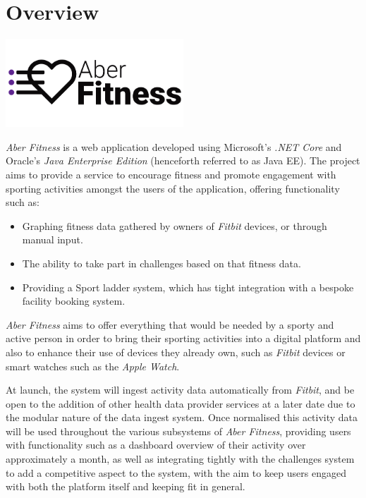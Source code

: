\chapter{Overview}

\begin{center}
	\includegraphics[width=0.5\textwidth]{Images/aberfitness.png}
\end{center}

\par
\textit{Aber Fitness} is a web application developed using Microsoft's \textit{.NET Core} and Oracle's \textit{Java Enterprise Edition} (henceforth referred to as Java EE). The project aims to provide a service to encourage fitness and promote engagement with sporting activities amongst the users of the application, offering functionality such as:

\begin{itemize}
\item Graphing fitness data gathered by owners of \textit{Fitbit} devices, or through manual input.
\item The ability to take part in challenges based on that fitness data.
\item Providing a Sport ladder system, which has tight integration with a bespoke facility booking system.
\end{itemize}

\textit{Aber Fitness} aims to offer everything that would be needed by a sporty and active person in order to bring their sporting activities into a digital platform and also to enhance their use of devices they already own, such as \textit{Fitbit} devices or smart watches such as the \textit{Apple Watch}.

\par
At launch, the system will ingest activity data automatically from \textit{Fitbit}, and be open to the addition of other health data provider services at a later date due to the modular nature of the data ingest system. Once normalised this activity data will be used throughout the various subsystems of \textit{Aber Fitness}, providing users with functionality such as a dashboard overview of their activity over approximately a month, as well as integrating tightly with the challenges system to add a competitive aspect to the system, with the aim to keep users engaged with both the platform itself and keeping fit in general. 

